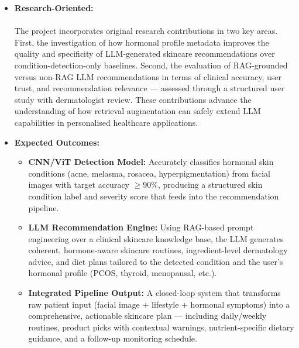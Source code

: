 \begin{itemize}
\begin{itemize}[label=$\diamond$]
    \item \textbf{Multimodal AI Integration:} The fusion of image-based condition detection (CNN/ViT) with structured metadata and retrieval-augmented generation represents a novel end-to-end multimodal pipeline for personalised health recommendation.
    \end{itemize}
    \vspace{0.5cm}

    \item \textbf{Research-Oriented:}\\
    \\\hspace*{0.5in}The project incorporates original research contributions in two key areas. First, the investigation of how hormonal profile metadata improves the quality and specificity of LLM-generated skincare recommendations over condition-detection-only baselines. Second, the evaluation of RAG-grounded versus non-RAG LLM recommendations in terms of clinical accuracy, user trust, and recommendation relevance — assessed through a structured user study with dermatologist review. These contributions advance the understanding of how retrieval augmentation can safely extend LLM capabilities in personalised healthcare applications.

    \item \textbf{Expected Outcomes:}
    \vspace{0.5cm}
    \begin{itemize}[label=$\diamond$]
        \item \textbf{CNN/ViT Detection Model:} Accurately classifies hormonal skin conditions (acne, melasma, rosacea, hyperpigmentation) from facial images with target accuracy $\geq 90\%$, producing a structured skin condition label and severity score that feeds into the recommendation pipeline.

        \item \textbf{LLM Recommendation Engine:} Using RAG-based prompt engineering over a clinical skincare knowledge base, the LLM generates coherent, hormone-aware skincare routines, ingredient-level dermatology advice, and diet plans tailored to the detected condition and the user's hormonal profile (PCOS, thyroid, menopausal, etc.).

        \item \textbf{Integrated Pipeline Output:} A closed-loop system that transforms raw patient input (facial image + lifestyle + hormonal symptoms) into a comprehensive, actionable skincare plan — including daily/weekly routines, product picks with contextual warnings, nutrient-specific dietary guidance, and a follow-up monitoring schedule.
    \end{itemize}
\end{itemize}
